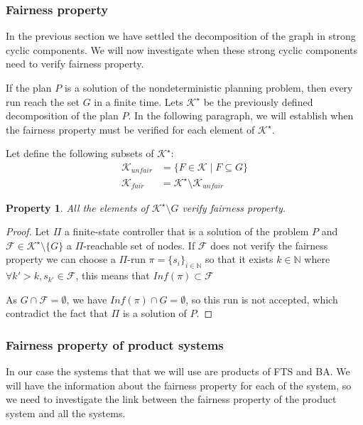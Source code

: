 \documentclass{article}
\newtheorem{property}{Property}
\theoremstyle{named}
\newcommand{\propsymbol}{\( \blacklozenge \)}
\newenvironment{prop}[0]
    {\begin{samepage}
    \begin{property}
    \renewcommand{\qedsymbol}{\propsymbol}\pushQED{\qed}
    }
    {
    \popQED %
    \end{property} 
    \end{samepage}
    }
\begin{document}
\subsubsection{Fairness property}
In the previous section we have settled the decomposition of the graph in strong cyclic components.
We will now investigate when these strong cyclic components need to verify fairness property.

If the plan $P$ is a solution of the nondeterministic planning problem, then every run reach the set $G$ in a finite time.
Lets $\mathcal{K}^\star$ be the previously defined decomposition of the plan $P$.
In the following paragraph, we will establish when the fairness property must be verified for each element of $\mathcal{K}^\star$.

Let define the following subsets of $\mathcal{K}^\star$:
\begin{align}
\mathcal{K}_{unfair} &= \{ F \in \mathcal{K} \mid F \subseteq G \}\\
\mathcal{K}_{fair} &= \mathcal{K}^\star \setminus \mathcal{K}_{unfair}
\end{align}

\begin{prop}
All the elements of $\mathcal{K}^\star \setminus {G}$ verify fairness property.
\end{prop}

\begin{proof}
Let $\Pi$ a finite-state controller that is a solution of the problem $P$ and $\mathcal{F} \in \mathcal{K}^\star \setminus \{G\}$ a $\Pi$-reachable set of nodes.
If $\mathcal{F}$ does not verify the fairness property we can choose a $\Pi$-run $\pi = \{s_i\}_{i\in\mathbb{N}}$ so that it exists $k\in\mathbb{N}$ where $\forall k'>k, s_{k'} \in \mathcal{F}$, this means that $Inf(\pi) \subset \mathcal{F}$

As $G \cap \mathcal{F} = \emptyset$, we have $Inf(\pi) \cap G =\emptyset$, so this run is not accepted, which contradict the fact that $\Pi$ is a solution of $P$.
\end{proof}


\subsubsection{Fairness property of product systems}
In our case the systems that that we will use are products of FTS and BA. We will have the information about the fairness property for each of the system, so we need to investigate the link between the fairness property of the product system and all the systems.
\end{document}
